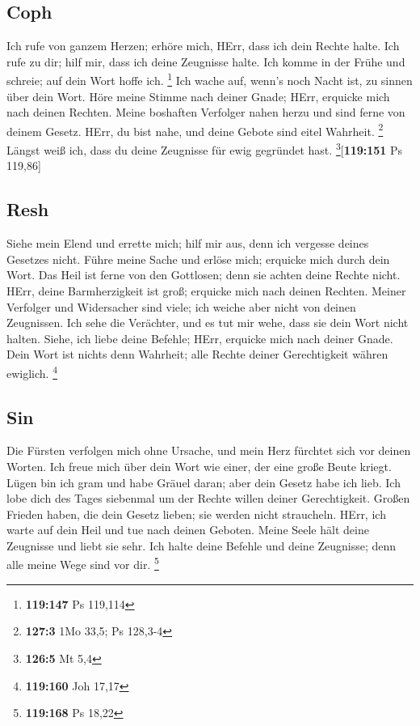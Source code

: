 \hypertarget{coph}{%
\subsection{Coph}\label{coph}}

 Ich rufe von ganzem Herzen; erhöre mich, HErr, dass ich
dein Rechte halte.  Ich rufe zu dir; hilf mir, dass ich
deine Zeugnisse halte.  Ich komme in der Frühe und
schreie; auf dein Wort hoffe ich. \footnote{\textbf{119:147} Ps 119,114}
 Ich wache auf, wenn's noch Nacht ist, zu sinnen über
dein Wort.  Höre meine Stimme nach deiner Gnade; HErr,
erquicke mich nach deinen Rechten.  Meine boshaften
Verfolger nahen herzu und sind ferne von deinem Gesetz. 
HErr, du bist nahe, und deine Gebote sind eitel Wahrheit. \footnote{\textbf{127:3}
  1Mo 33,5; Ps 128,3-4}  Längst weiß ich, dass du deine
Zeugnisse für ewig gegründet hast. \footnote{\textbf{126:5} Mt 5,4}{[}\textbf{119:151}
Ps 119,86{]}

\hypertarget{resh}{%
\subsection{Resh}\label{resh}}

 Siehe mein Elend und errette mich; hilf mir aus, denn
ich vergesse deines Gesetzes nicht.  Führe meine Sache
und erlöse mich; erquicke mich durch dein Wort.  Das
Heil ist ferne von den Gottlosen; denn sie achten deine Rechte nicht.
 HErr, deine Barmherzigkeit ist groß; erquicke mich nach
deinen Rechten.  Meiner Verfolger und Widersacher sind
viele; ich weiche aber nicht von deinen Zeugnissen.  Ich
sehe die Verächter, und es tut mir wehe, dass sie dein Wort nicht
halten.  Siehe, ich liebe deine Befehle; HErr, erquicke
mich nach deiner Gnade.  Dein Wort ist nichts denn
Wahrheit; alle Rechte deiner Gerechtigkeit währen ewiglich. \footnote{\textbf{119:160}
  Joh 17,17}

\hypertarget{sin}{%
\subsection{Sin}\label{sin}}

 Die Fürsten verfolgen mich ohne Ursache, und mein Herz
fürchtet sich vor deinen Worten.  Ich freue mich über
dein Wort wie einer, der eine große Beute kriegt.  Lügen
bin ich gram und habe Gräuel daran; aber dein Gesetz habe ich lieb.
 Ich lobe dich des Tages siebenmal um der Rechte willen
deiner Gerechtigkeit.  Großen Frieden haben, die dein
Gesetz lieben; sie werden nicht straucheln.  HErr, ich
warte auf dein Heil und tue nach deinen Geboten.  Meine
Seele hält deine Zeugnisse und liebt sie sehr.  Ich
halte deine Befehle und deine Zeugnisse; denn alle meine Wege sind vor
dir. \footnote{\textbf{119:168} Ps 18,22}

